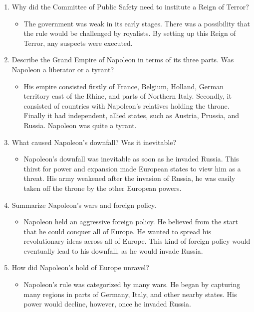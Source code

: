 \documentclass[12pt]{article}
\begin{document}
\begin{enumerate}
\item Why did the Committee of Public Safety need to institute a Reign of Terror?

	\begin{itemize}
	\item The government was weak in its early stages. There was a possibility that the rule would be challenged by royalists. By setting up this Reign of Terror, any suspects were executed.
	\end{itemize}

\item Describe the Grand Empire of Napoleon in terms of its three parts. Was Napoleon a liberator or a tyrant?

	\begin{itemize}
	\item His empire consisted firstly of France, Belgium, Holland, German territory east of the Rhine, and parts of Northern Italy. Secondly, it consisted of countries with Napoleon's relatives holding the throne. Finally it had independent, allied states, such as Austria, Prussia, and Russia. Napoleon was quite a tyrant.
	\end{itemize}

\item What caused Napoleon's downfall? Was it inevitable?

	\begin{itemize}
	\item Napoleon's downfall was inevitable as soon as he invaded Russia. This thirst for power and expansion made European states to view him as a threat. His army weakened after the invasion of Russia, he was easily taken off the throne by the other European powers.
	\end{itemize}

\item Summarize Napoleon's wars and foreign policy.

	\begin{itemize}
	\item Napoleon held an aggressive foreign policy. He believed from the start that he could conquer all of Europe. He wanted to spread his revolutionary ideas across all of Europe. This kind of foreign policy would eventually lead to his downfall, as he would invade Russia.
	\end{itemize}
	
\item How did Napoleon's hold of Europe unravel?

	\begin{itemize}
	\item Napoleon's rule was categorized by many wars. He began by capturing many regions in parts of Germany, Italy, and other nearby states. His power would decline, however, once he invaded Russia.
	\end{itemize}
	

\end{enumerate}
\end{document}
